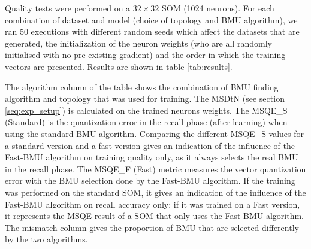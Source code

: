 	Quality tests were performed on a $32\times32$ SOM (1024 neurons). For each combination of dataset and model (choice of topology and BMU algorithm), we ran 50 executions with different random seeds which affect the datasets that are generated, the initialization of the neuron weights (who are all randomly initialised with no pre-existing gradient) and the order in which the training vectors are presented. Results are shown in table \ref{tab:results}.

	The algorithm column of the table shows the combination of BMU finding algorithm and topology that was used for training. The MSDtN (see section \ref{seq:exp_setup}) is calculated on the trained neurons weights. The MSQE\_S (Standard) is the quantization error in the recall phase (after learning) when using the standard BMU algorithm. Comparing the different MSQE\_S values for a standard version and a fast version gives an indication of the influence of the Fast-BMU algorithm on training quality only, as it always selects the real BMU in the recall phase. The MSQE\_F (Fast) metric measures the vector quantization error with the BMU selection done by the Fast-BMU algorithm. If the training was performed on the standard SOM, it gives an indication of the influence of the Fast-BMU algorithm on recall accuracy only; if it was trained on a Fast version, it represents the MSQE result of a SOM that only uses the Fast-BMU algorithm. The mismatch column gives the proportion of BMU that are selected differently by the two algorithms.

